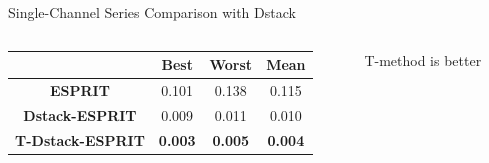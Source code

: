 \documentclass[pdf, unicode, ucs, notheorems]{beamer}
\newcommand{\bluetext}[1]{{\usebeamercolor[fg]{bluetext_color}#1}}
\theoremstyle{definition}
\begin{document}
\begin{frame}{Single-Channel Series Comparison with Dstack}
  \begin{columns}
    \begin{column}{0.7\textwidth}
      \begin{table}[ht]
        \centering
        \begin{tabular}{c|ccc}
          \hline
          & Best & Worst & Mean \\
          \hline
          \textbf{ESPRIT} & 0.101 & 0.138 & 0.115 \\
          \textbf{Dstack-ESPRIT} & 0.009 & 0.011 & 0.010 \\
          \textbf{T-Dstack-ESPRIT} & \textbf{\bluetext{0.003}} &
          \textbf{\bluetext{0.005}} &
          \textbf{\bluetext{0.004}} \\
          \hline
        \end{tabular}
      \end{table}
    \end{column}
    \begin{column}{0.3\textwidth}
      T-method is better
    \end{column}
  \end{columns}

\end{frame}
\end{document}

